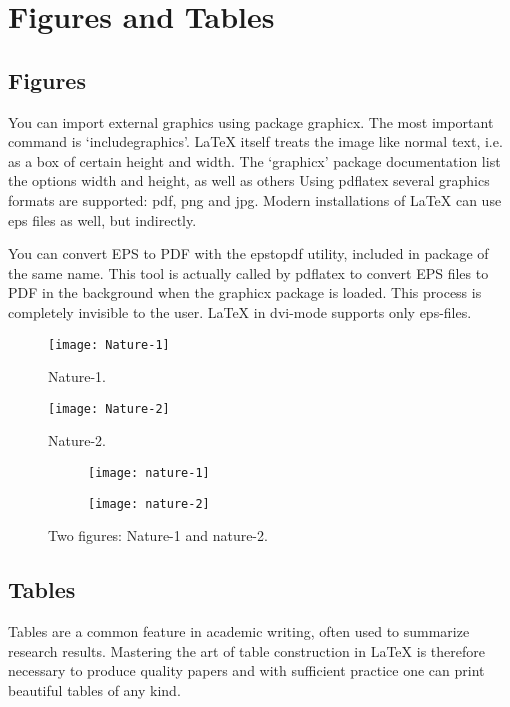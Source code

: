\chapter{Figures and Tables}

\section{Figures}
You can import external graphics using package graphicx.
The most important command is `includegraphics'.
LaTeX itself treats the image like normal text, i.e. as a box of certain height and width.
The `graphicx' package documentation list the options width and height, as well as others
Using pdflatex several graphics formats are supported: pdf, png and jpg.
Modern installations of LaTeX can use eps files as well, but indirectly.

You can convert EPS to PDF with the epstopdf utility, included in package of the same name. This tool is actually called by pdflatex to convert EPS files to PDF in the background when the graphicx package is loaded. This process is completely invisible to the user. LaTeX in dvi-mode supports only eps-files. 


\begin{figure}[b]
	\centering
	\texttt{[image: Nature-1]}
	\caption{Nature-1.}
	\label{fig:Nature-1}
\end{figure}

\begin{figure}
	\centering
	\texttt{[image: Nature-2]}
	\caption{Nature-2.}
	\label{fig:Nature-2}
\end{figure}

\begin{figure}[tbp]
	\centering
	\begin{subfigure}[b]{0.45\textwidth}
		\texttt{[image: nature-1]}
		\caption{}
		\label{fig:n1}
	\end{subfigure}
	\qquad
	\begin{subfigure}[b]{0.45\textwidth}
		\texttt{[image: nature-2]}
		\caption{}
		\label{fig:n2}
	\end{subfigure}
	\caption{Two figures: Nature-1 and nature-2.}\label{fig:figs}
\end{figure}

\section{Tables}
Tables are a common feature in academic writing, often used to summarize research results. Mastering the art of table construction in LaTeX is therefore necessary to produce quality papers and with sufficient practice one can print beautiful tables of any kind.

